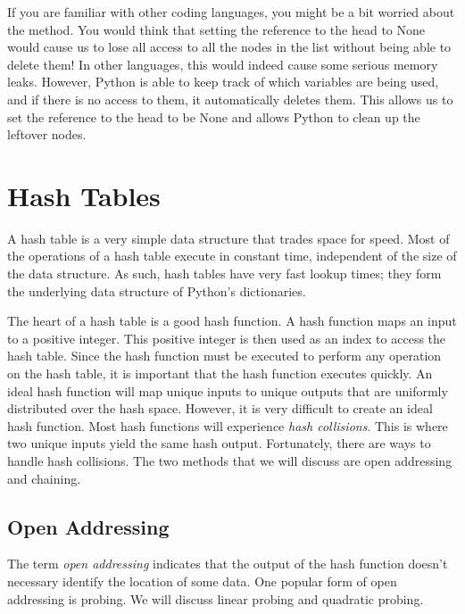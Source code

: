 If you are familiar with other coding languages, you might be a bit worried about the  method.
You would think that setting the reference to the head to None would cause us to lose all access to all the nodes in the list without being able to delete them!
In other languages, this would indeed cause some serious memory leaks.
However, Python is able to keep track of which variables are being used, and if there is no access to them, it automatically deletes them.
This allows us to set the reference to the head to be None and allows Python to clean up the leftover nodes.

\section*{Hash Tables}
A hash table is a very simple data structure that trades space for speed.
Most of the operations of a hash table execute in constant time, independent of the size of the data structure.
 As such, hash tables have very fast lookup times;  they form the underlying data structure of Python's dictionaries.

The heart of a hash table is a good hash function.
A hash function maps an input to a positive integer.
This positive integer is then used as an index to access the hash table.
Since the hash function must be executed to perform any operation on the hash table, it is important that the hash function executes quickly.
An ideal hash function will map unique inputs to unique outputs that are uniformly distributed over the hash space.
However, it is very difficult to create an ideal hash function.  Most hash functions will experience \emph{hash collisions}.
This is where two unique inputs yield the same hash output.
Fortunately, there are ways to handle hash collisions.  The two methods that we will discuss are open addressing and chaining.

\subsection*{Open Addressing}
The term \emph{open addressing} indicates that the output of the hash function doesn't necessary identify the location of some data.
One popular form of open addressing is probing.
We will discuss linear probing and quadratic probing.

